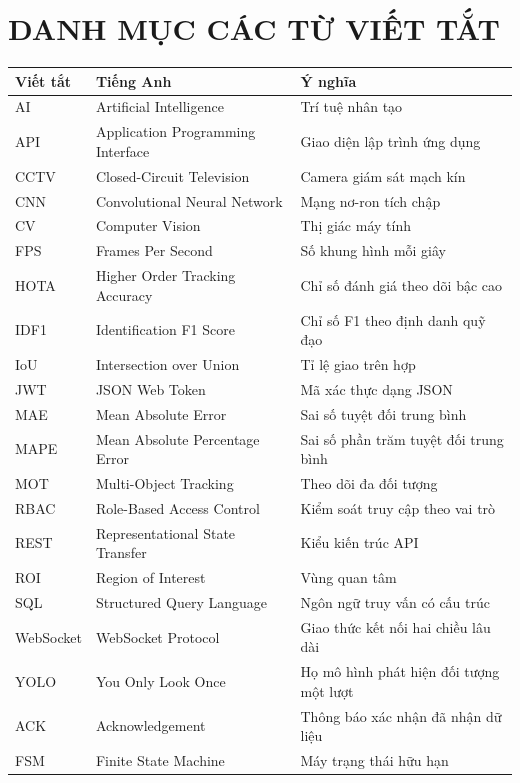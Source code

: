 \section*{DANH MỤC CÁC TỪ VIẾT TẮT}
\begingroup
\renewcommand{\reporttablelinespread}{1.0}
\begin{longtable}{p{2.6cm}p{5.5cm}p{5.1cm}}
\textbf{Viết tắt} & \textbf{Tiếng Anh} & \textbf{Ý nghĩa}\\\endfirsthead
AI & Artificial Intelligence & Trí tuệ nhân tạo\\
API & Application Programming Interface & Giao diện lập trình ứng dụng\\
CCTV & Closed-Circuit Television & Camera giám sát mạch kín\\
CNN & Convolutional Neural Network & Mạng nơ-ron tích chập\\
CV & Computer Vision & Thị giác máy tính\\
FPS & Frames Per Second & Số khung hình mỗi giây\\
HOTA & Higher Order Tracking Accuracy & Chỉ số đánh giá theo dõi bậc cao\\
IDF1 & Identification F1 Score & Chỉ số F1 theo định danh quỹ đạo\\
IoU & Intersection over Union & Tỉ lệ giao trên hợp\\
JWT & JSON Web Token & Mã xác thực dạng JSON\\
MAE & Mean Absolute Error & Sai số tuyệt đối trung bình\\
MAPE & Mean Absolute Percentage Error & Sai số phần trăm tuyệt đối trung bình\\
MOT & Multi-Object Tracking & Theo dõi đa đối tượng\\
RBAC & Role-Based Access Control & Kiểm soát truy cập theo vai trò\\
REST & Representational State Transfer & Kiểu kiến trúc API\\
ROI & Region of Interest & Vùng quan tâm\\
SQL & Structured Query Language & Ngôn ngữ truy vấn có cấu trúc\\
WebSocket & WebSocket Protocol & Giao thức kết nối hai chiều lâu dài\\
YOLO & You Only Look Once & Họ mô hình phát hiện đối tượng một lượt\\
ACK & Acknowledgement & Thông báo xác nhận đã nhận dữ liệu\\
FSM & Finite State Machine & Máy trạng thái hữu hạn\\

\end{longtable}
